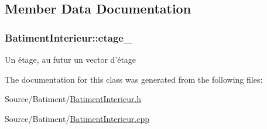 \subsection{Member Data Documentation}
\hypertarget{classBatimentInterieur_ab5b2d5c46bfd8fdf62654a008b3caf7a}{
\subsubsection[{etage\-\_\-}]{ Batiment\-Interieur\-::etage\-\_\-\hspace{0.3cm}{\ttfamily [private]}}}\label{classBatimentInterieur_ab5b2d5c46bfd8fdf62654a008b3caf7a}
Un étage, au futur un vector d'étage 

The documentation for this class was generated from the following files\-:\begin{DoxyCompactItemize}
\item 
Source/\-Batiment/\hyperlink{BatimentInterieur_8h}{Batiment\-Interieur.\-h}\item 
Source/\-Batiment/\hyperlink{BatimentInterieur_8cpp}{Batiment\-Interieur.\-cpp}\end{DoxyCompactItemize}
